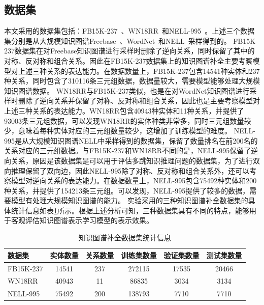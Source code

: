 \documentclass[algorithmlist, AutoFakeBold, AutoFakeSlant, figurelist, tablelist, nomlist, engineering]{seuthesix}
\begin{document}
\subsection{数据集}
本文采用的数据集包括：FB15K-237~\cite{toutanova2015representing}、WN18RR~\cite{dettmers2018convolutional}和NELL-995~\cite{xiong2017deeppath}。上述三个数据集分别是从大规模知识图谱Freebase~\cite{bollacker2008freebase}、WordNet~\cite{glorot2010understanding}和NELL~\cite{carlson2010toward}采样得到的。
FB15K-237数据集在对Freebase知识图谱进行采样时删除了逆向关系，同时保留了其中的对称、反对称和组合关系。因此在FB15K-237数据集上的知识图谱补全主要考察模型对上述三种关系的表达能力。在数据数量上，FB15K-237包含14541种实体和237种关系，同时包含了310116条三元组数据，数据量较大，需要模型能够处理大规模知识图谱数据。
WN18RR与FB15K-237类似，也是在对WordNet知识图谱进行采样时删除了逆向关系并保留了对称、反对称和组合关系，因此也是主要考察模型对上述三种关系的表达能力。WN18RR包含40943种实体和11种关系，并提供了93003条三元组数据，可以发现WN18RR的实体种类非常多，同时三元组数量较少，意味着每种实体对应的三元组数量较少，这增加了训练模型的难度。
NELL-995是从大规模知识图谱NELL中采样得到的数据集，保留了数量排名在前200名的关系对应的三元组数据。与FB15K-237和WN18RR不同的是，NELL-995保留了逆向关系，原因是该数据集是可以用于评估多跳知识推理问题的数据集，为了进行双向推理保留了双向边，因此NELL-995除了对称、反对称和组合关系外，还可以考察模型对逆向关系的表达能力。在数据数量上，NELL-995包含75492种实体和200种关系，并提供了154213条三元组。可以发现，NELL-995提供了较多的数据，需要模型有处理大规模知识图谱的能力。
实验采用的三种知识图谱补全数据集的具体统计信息如表\ref{Datasets1}所示。根据上述分析可知，三种数据集具有不同的特点，能够用于客观评估知识图谱表示学习模型的表示效果。
\begin{table}[]
  \centering
  \begin{tabular*}{0.95\textwidth}{@{\extracolsep{\fill}}lccccc}
  \toprule[1pt]
  数据集 & 实体数量 & 关系数量 & 训练集数量 & 验证集数量 & 测试集数量 \\ \hline
  FB15K-237 & 14541 & 237 & 272115 & 17535 & 20466\\
  WN18RR & 40943 & 11 & 86835 & 3034 & 3134\\
  NELL-995 & 75492 & 200 & 138793 & 7710 & 7710\\
  \bottomrule[1pt]
	\end{tabular*}
  \caption{知识图谱补全数据集统计信息}
  \label{Datasets1}
\end{table}
\end{document}
